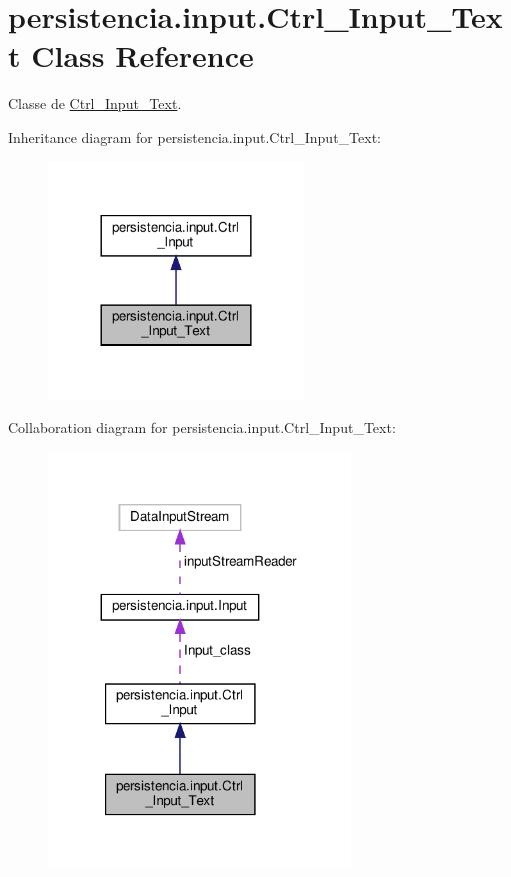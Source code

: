 \hypertarget{classpersistencia_1_1input_1_1Ctrl__Input__Text}{}\section{persistencia.\+input.\+Ctrl\+\_\+\+Input\+\_\+\+Text Class Reference}
\label{classpersistencia_1_1input_1_1Ctrl__Input__Text}


Classe de \hyperlink{classpersistencia_1_1input_1_1Ctrl__Input__Text}{Ctrl\+\_\+\+Input\+\_\+\+Text}.  




Inheritance diagram for persistencia.\+input.\+Ctrl\+\_\+\+Input\+\_\+\+Text\+:\nopagebreak
\begin{figure}[H]
\begin{center}
\leavevmode
\includegraphics[width=192pt]{classpersistencia_1_1input_1_1Ctrl__Input__Text__inherit__graph}
\end{center}
\end{figure}


Collaboration diagram for persistencia.\+input.\+Ctrl\+\_\+\+Input\+\_\+\+Text\+:
\nopagebreak
\begin{figure}[H]
\begin{center}
\leavevmode
\includegraphics[width=227pt]{classpersistencia_1_1input_1_1Ctrl__Input__Text__coll__graph}
\end{center}
\end{figure}
